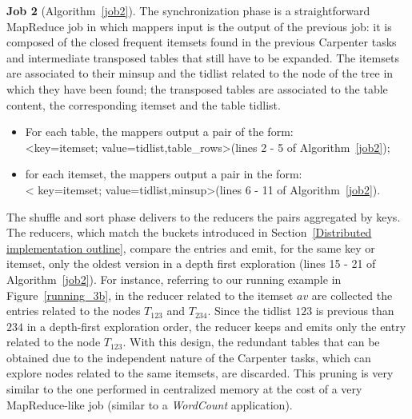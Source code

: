 \textbf{Job 2} (Algorithm~\ref{job2}). The synchronization phase is a straightforward
MapReduce job in which mappers input is the output of the previous job: it is
 composed of the closed frequent itemsets found in the previous Carpenter tasks
 and intermediate transposed tables that still have to be expanded. The itemsets
 are associated to their minsup and the tidlist related to the node of the tree
 in which they have been found; the transposed tables are associated to the
table content,
 the corresponding itemset and the table tidlist. 
\begin{itemize}
\item For each table, the mappers output a pair of the form: \\
\textless key=itemset; value=tidlist,table\_rows\textgreater  (lines 2 - 5 of Algorithm~\ref{job2}); 
\item for each itemset, the mappers output a pair in the form: \\ \textless
key=itemset; value=tidlist,minsup\textgreater (lines 6 - 11 of Algorithm~\ref{job2}).
\end{itemize}
 The shuffle and sort phase
 delivers to the reducers the pairs aggregated by keys. The reducers, which
match the buckets introduced in Section~\ref{Distributed implementation
outline}, compare the
 entries and emit, for the same key or itemset, only the oldest version in a
 depth first exploration (lines 15 - 21 of Algorithm~\ref{job2}). For instance, referring to our running example in
Figure~\ref{running_3b}, in the reducer related to the itemset $av$ are collected the
entries related to the nodes $T_{1 2 3}$ and $T_{2 3 4}$. Since the tidlist $1 2
3$ is previous than $2 3 4$ in a depth-first exploration order, the reducer
keeps and emits only the entry related to the node $T_{1 2 3}$.
 With this design, the redundant tables that can be obtained due to the independent nature of the Carpenter tasks, which can explore nodes related to the same itemsets, are discarded. This pruning is very
similar to the one
 performed in centralized memory at the cost of a very MapReduce-like job (similar to a \textit{WordCount} application).\\



